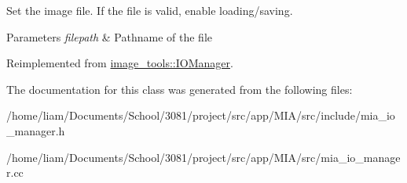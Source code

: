 Set the image file. If the file is valid, enable loading/saving. 


\begin{DoxyParams}{Parameters}
{\em filepath} & Pathname of the file \\
\hline
\end{DoxyParams}


Reimplemented from \hyperlink{classimage__tools_1_1IOManager_a9ddac98843256d25442aba6c963e144a}{image\+\_\+tools\+::\+I\+O\+Manager}.



The documentation for this class was generated from the following files\+:\begin{DoxyCompactItemize}
\item 
/home/liam/\+Documents/\+School/3081/project/src/app/\+M\+I\+A/src/include/mia\+\_\+io\+\_\+manager.\+h\item 
/home/liam/\+Documents/\+School/3081/project/src/app/\+M\+I\+A/src/mia\+\_\+io\+\_\+manager.\+cc\end{DoxyCompactItemize}
